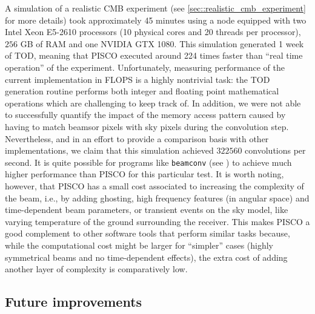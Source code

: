 \documentclass[a4paper,11pt]{article}
\begin{document}
A simulation of a realistic CMB experiment (see \ref{sec::realistic_cmb_experiment} for more details) took approximately 45 minutes using a node equipped with two Intel Xeon E5-2610 processors (10 physical cores and 20 threads per processor), $256$ GB of RAM and one NVIDIA GTX 1080. This simulation generated 1 week of TOD, meaning that PISCO executed around 224 times faster than ``real time operation'' of the experiment. Unfortunately, measuring performance of the current implementation in FLOPS is a highly nontrivial task: the TOD generation routine performs both integer and floating point mathematical operations which are challenging to keep track of. In addition, we were not able to successfully quantify the impact of the memory access pattern caused by having to match beamsor pixels with sky pixels during the convolution step. Nevertheless, and in an effort to provide a comparison basis with other implementations, we claim that this simulation achieved $322560$ convolutions per second. It is quite possible for programs like \texttt{beamconv} (see \cite{2018arXiv180905034D}) to achieve much higher performance than PISCO for this particular test. It is worth noting, however, that PISCO has a small cost associated to increasing the complexity of the beam, i.e., by adding ghosting, high frequency features (in angular space) and time-dependent beam parameters, or transient events on the sky model, like varying temperature of the ground surrounding the receiver. This makes PISCO a good complement to other software tools that perform similar tasks because, while the computational cost might be larger for ``simpler'' cases (highly symmetrical beams and no time-dependent effects), the extra cost of adding another layer of complexity is comparatively low. %

\subsection{Future improvements}
\end{document}
